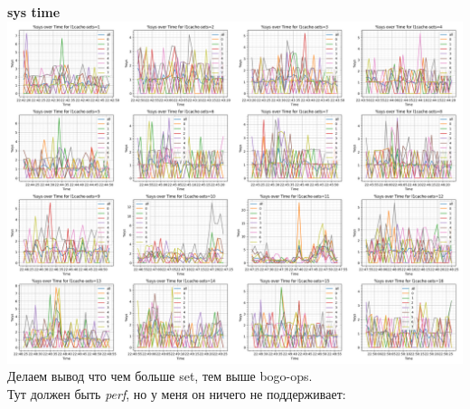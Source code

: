 \textbf{sys time}\\
\includegraphics[width=\textwidth]{./cache/image/l1cache-sets-sys-cpu.png}
Делаем вывод что чем больше set, тем выше bogo-ops.\\
Тут должен быть \textit{perf}, но у меня он ничего не поддерживает:\\
